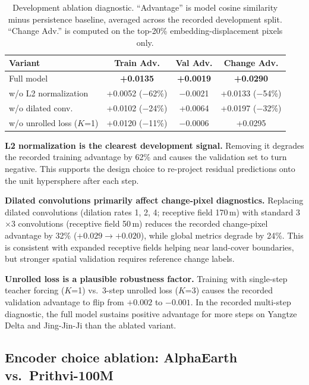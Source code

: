 \documentclass{article}
\begin{document}
\begin{table}[htbp]
\centering
\caption{Development ablation diagnostic. ``Advantage'' is model cosine similarity minus persistence baseline, averaged across the recorded development split. ``Change Adv.'' is computed on the top-20\% embedding-displacement pixels only.}
\label{tab:ablation}
\begin{tabular}{lccc}
\toprule
Variant & Train Adv. & Val Adv. & Change Adv. \\
\midrule
Full model & \textbf{+0.0135} & \textbf{+0.0019} & \textbf{+0.0290} \\
w/o L2 normalization & +0.0052 ($-$62\%) & $-$0.0021 & +0.0133 ($-$54\%) \\
w/o dilated conv. & +0.0102 ($-$24\%) & +0.0064 & +0.0197 ($-$32\%) \\
w/o unrolled loss ($K$=1) & +0.0120 ($-$11\%) & $-$0.0006 & +0.0295 \\
\bottomrule
\end{tabular}
\end{table}

\textbf{L2 normalization is the clearest development signal.} Removing it degrades the recorded training advantage by 62\% and causes the validation set to turn negative. This supports the design choice to re-project residual predictions onto the unit hypersphere after each step.

\textbf{Dilated convolutions primarily affect change-pixel diagnostics.} Replacing dilated convolutions (dilation rates 1, 2, 4; receptive field 170\,m) with standard 3$\times$3 convolutions (receptive field 50\,m) reduces the recorded change-pixel advantage by 32\% ($+0.029 \to +0.020$), while global metrics degrade by 24\%. This is consistent with expanded receptive fields helping near land-cover boundaries, but stronger spatial validation requires reference change labels.

\textbf{Unrolled loss is a plausible robustness factor.} Training with single-step teacher forcing ($K$=1) vs.\ 3-step unrolled loss ($K$=3) causes the recorded validation advantage to flip from $+0.002$ to $-0.001$. In the recorded multi-step diagnostic, the full model sustains positive advantage for more steps on Yangtze Delta and Jing-Jin-Ji than the ablated variant.

\subsection{Encoder choice ablation: AlphaEarth vs.\ Prithvi-100M}
\label{sec:encoder_ablation}
\end{document}
